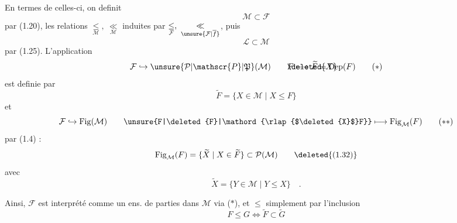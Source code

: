 En termes de celles-ci, on definit 
\[
\mathcal{M}\subset\mathcal{F}
\]
par (1.20),  les relations $\underset{\mathcal{M}}{\leq},\ \underset{\mathcal{M}}{\ll}$ induites par $\underset{\mathcal{F}}{\leq},\ \underset{\unsure{\mathcal{F}|\overline{f}}}{\ll}$, puis
\[
\mathcal{L}\subset\mathcal{M}
\]
par (1.25). L'application
\[
\mathcal{F}\hookrightarrow\unsure{\mathcal{P}|\mathscr{P}|\mathfrak{P}}(\mathcal{M})\qquad
\mathord{\rlap{$\deleted{X}$}F}\longmapsto\widetilde F=\mathrm{Dep}(F)
\tag*{($*$)}
\]
est  definie par
\[
\widetilde F=\{X\in\mathcal{M}\mid X\leq F\}
\tag*{(1.31)}
\]
et
\[
\mathcal{F}\hookrightarrow\mathrm{Fig}(\mathcal{M})\qquad
\unsure{F|\deleted{F}|\mathord{\rlap{$\deleted{X}$}F}}\longmapsto\mathrm{Fig}_{\mathcal{M}}(F)
\tag*{($**$)}
\]
par (1.4) :
\[
\mathrm{Fig}_{\mathcal{M}}(F)=\{\widetilde X\mid X\in\widetilde F\}\subset\mathcal{P}(\mathcal{M})
\tag*{\deleted{(1.32)}}
\]
avec
\[
\widetilde X=\{Y\in\mathcal{M}\mid Y\leq X\}\quad.
\]

Ainsi, $\mathcal{F}$ est interprété comme un ens. de parties dans $\mathcal{M}$ via ($*$), et $\leq$  simplement par l'inclusion
\[
F\leq G\Longleftrightarrow\widetilde F\subset\widetilde G
\tag*{(1.32)}
\]

